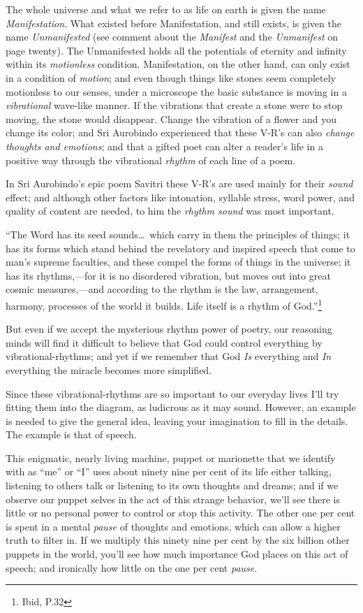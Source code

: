 \documentclass[12pt,a4paper]{book}
\begin{document}
The whole universe and what we refer to as life on earth is given the
name \emph{Manifestation}.  What existed before Manifestation, and
still exists, is given the name \emph{Unmanifested} (see comment about
the \emph{Manifest} and the \emph{Unmanifest} on page
twenty).  The Unmanifested holds all the potentials of
eternity and infinity within its \emph{motionless} condition.
Manifestation, on the other hand, can only exist in a condition of
\emph{motion}; and even though things like stones seem completely
motionless to our senses, under a microscope the basic substance is
moving in a \emph{vibrational} wave-like manner.  If the vibrations
that create a stone were to stop moving, the stone would disappear.
Change the vibration of a flower and you change its color; and Sri
Aurobindo experienced that these V-R's can also \emph{change thoughts
  and emotions}; and that a gifted poet can alter a reader's life in a
positive way through the vibrational \emph{rhythm} of each line of a
poem.

In Sri Aurobindo's epic poem Savitri these V-R's are used mainly for
their \emph{sound} effect; and although other factors like intonation,
syllable stress, word power, and quality of content are needed, to him
the \emph{rhythm sound} was most important.

``The Word has its seed sounds\ldots\ which carry in them the
principles of things; it has its forms which stand behind the
revelatory and inspired speech that come to man's supreme faculties,
and these compel the forms of things in the universe; it has its
rhythms,---for it is no disordered vibration, but moves out into great
cosmic measures,---and according to the rhythm is the law,
arrangement, harmony, processes of the world it builds. Life itself is
a rhythm of God.''\footnote{Ibid, P.32}


But even if we accept the mysterious rhythm power of poetry, our
reasoning minds will find it difficult to believe that God could
control everything by vibrational-rhythms; and yet if we remember that
God \emph{Is} everything and \emph{In} everything the miracle becomes
more simplified.

Since these vibrational-rhythms are so important to our everyday lives
I'll try fitting them into the diagram, as ludicrous as it may
sound. However, an example is needed to give the general idea, leaving
your imagination to fill in the details. The example is that of
speech.

This enigmatic, nearly living machine, puppet or marionette that we
identify with as ``me'' or ``I'' uses about ninety nine per cent of
its life either talking, listening to others talk or listening to its
own thoughts and dreams; and if we observe our puppet selves in the
act of this strange behavior, we'll see there is little or no personal
power to control or stop this activity. The other one per cent is
spent in a mental \emph{pause} of thoughts and emotions, which can
allow a higher truth to filter in. If we multiply this ninety nine per
cent by the six billion other puppets in the world, you'll see how
much importance God places on this act of speech; and ironically how
little on the one per cent \emph{pause}.
\end{document}
